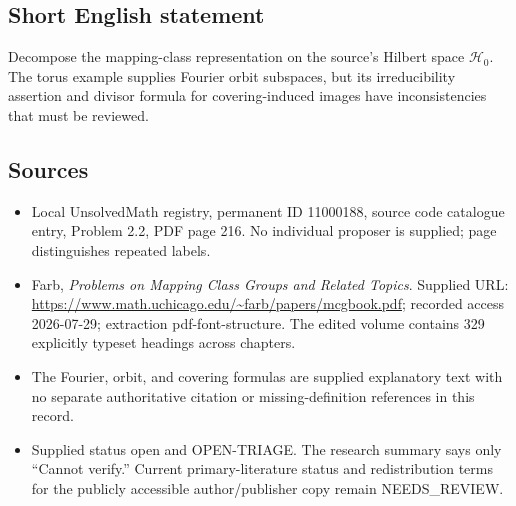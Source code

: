 \documentclass[11pt]{article}
\begin{document}
\subsection{Short English statement}
Decompose the mapping-class representation on the source's Hilbert space \(\mathcal H_0\). The torus example supplies Fourier orbit subspaces, but its irreducibility assertion and divisor formula for covering-induced images have inconsistencies that must be reviewed.
\subsection{Sources}
\begin{itemize}
\item Local UnsolvedMath registry, permanent ID 11000188, source code catalogue entry, Problem 2.2, PDF page 216. No individual proposer is supplied; page distinguishes repeated labels.
\item Farb, \emph{Problems on Mapping Class Groups and Related Topics}. Supplied URL: \url{https://www.math.uchicago.edu/~farb/papers/mcgbook.pdf}; recorded access 2026-07-29; extraction pdf-font-structure. The edited volume contains 329 explicitly typeset headings across chapters.
\item The Fourier, orbit, and covering formulas are supplied explanatory text with no separate authoritative citation or missing-definition references in this record.
\item Supplied status open and OPEN-TRIAGE. The research summary says only ``Cannot verify.'' Current primary-literature status and redistribution terms for the publicly accessible author/publisher copy remain NEEDS\_REVIEW.
\end{itemize}
\end{document}
